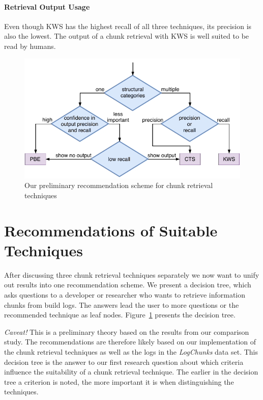 \documentclass[\myrootdir/main.tex]{subfiles}
\begin{document}
\paragraph{Retrieval Output Usage}
Even though KWS has the highest recall of all three techniques, its precision is also the lowest.
The output of a chunk retrieval with KWS is well suited to be read by humans.

\begin{figure}[htbp]
		\centering
		\includegraphics[width=\textwidth, clip]{img/crt-recommendation.pdf}
		\caption{Our preliminary recommendation scheme for chunk retrieval techniques}
		\label{fig:crt-recommendation}
\end{figure}

\section{Recommendations of Suitable Techniques}
After discussing three chunk retrieval techniques separately we now want to unify out results into one recommendation scheme.
We present a decision tree, which asks questions to a developer or researcher who wants to retrieve information chunks from build logs.
The answers lead the user to more questions or the recommended technique as leaf nodes.
Figure~\ref{fig:crt-recommendation} presents the decision tree.

\emph{Caveat!} This is a preliminary theory based on the results from our comparison study.
The recommendations are therefore likely based on our implementation of the chunk retrieval techniques as well as the logs in the \emph{LogChunks} data set.
This decision tree is the answer to our first research question about which criteria influence the suitability of a chunk retrieval technique.
The earlier in the decision tree a criterion is noted, the more important it is when distinguishing the techniques.
\end{document}
